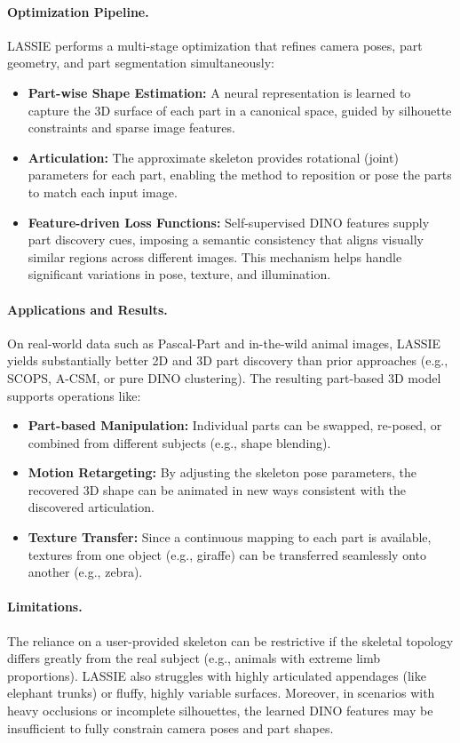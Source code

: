 \documentclass[11pt]{article}
\begin{document}
\paragraph{Optimization Pipeline.}
LASSIE performs a multi-stage optimization that refines camera poses, part geometry, and part segmentation simultaneously:
\begin{itemize}
    \item \textbf{Part-wise Shape Estimation:} A neural representation is learned to capture the 3D surface of each part in a canonical space, guided by silhouette constraints and sparse image features.
    \item \textbf{Articulation:} The approximate skeleton provides rotational (joint) parameters for each part, enabling the method to reposition or pose the parts to match each input image.
    \item \textbf{Feature-driven Loss Functions:} Self-supervised DINO features supply part discovery cues, imposing a semantic consistency that aligns visually similar regions across different images. This mechanism helps handle significant variations in pose, texture, and illumination.
\end{itemize}

\paragraph{Applications and Results.}
On real-world data such as Pascal-Part and in-the-wild animal images, LASSIE yields substantially better 2D and 3D part discovery than prior approaches (e.g., SCOPS, A-CSM, or pure DINO clustering). The resulting part-based 3D model supports operations like:
\begin{itemize}
    \item \textbf{Part-based Manipulation:} Individual parts can be swapped, re-posed, or combined from different subjects (e.g., shape blending).
    \item \textbf{Motion Retargeting:} By adjusting the skeleton pose parameters, the recovered 3D shape can be animated in new ways consistent with the discovered articulation.
    \item \textbf{Texture Transfer:} Since a continuous mapping to each part is available, textures from one object (e.g., giraffe) can be transferred seamlessly onto another (e.g., zebra).
\end{itemize}

\paragraph{Limitations.}
The reliance on a user-provided skeleton can be restrictive if the skeletal topology differs greatly from the real subject (e.g., animals with extreme limb proportions). LASSIE also struggles with highly articulated appendages (like elephant trunks) or fluffy, highly variable surfaces. Moreover, in scenarios with heavy occlusions or incomplete silhouettes, the learned DINO features may be insufficient to fully constrain camera poses and part shapes.
\end{document}
